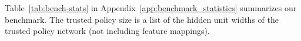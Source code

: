 Table~\ref{tab:bench-stats} in Appendix~\ref{app:benchmark_statistics} summarizes our benchmark. The trusted policy size is a list of the hidden unit widths of the trusted policy network (not including feature mappings).






